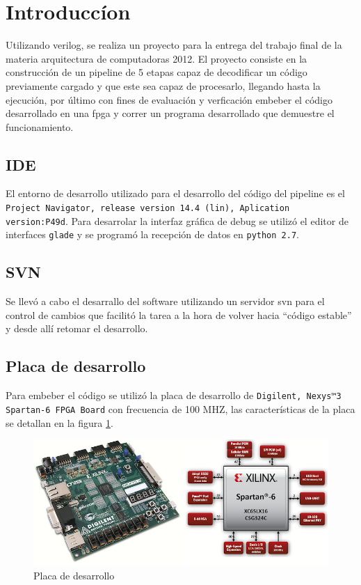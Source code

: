 \newpage
\section{Introducc\'ion}

Utilizando verilog, se realiza un proyecto para la entrega del trabajo final de la materia arquitectura de computadoras 2012. El proyecto consiste en la construcción de un pipeline de 5 etapas capaz de decodificar un código previamente cargado y que este sea capaz de procesarlo, llegando hasta la ejecución, por último con fines de evaluación y verficaci\'on embeber el c\'odigo desarrollado en una fpga y correr un programa desarrollado que demuestre el funcionamiento.

\subsection{IDE}
El entorno de desarrollo utilizado para el desarrollo del c\'odigo del pipeline es el \texttt{Project Navigator, release version 14.4 (lin), Aplication version:P49d}.
Para desarrolar la interfaz gr\'afica de debug se utiliz\'o el editor de interfaces \texttt{glade} y se program\'o la recepci\'on de datos en \texttt{python 2.7}. 

\subsection{SVN}
Se llev\'o a cabo el desarrallo del software utilizando un servidor svn para el control de cambios que facilit\'o la tarea a la hora de volver hacia ``c\'odigo estable'' y desde all\'i retomar el desarrollo.

\subsection{Placa de desarrollo}
Para embeber el c\'odigo se utiliz\'o la placa de desarrollo de \texttt{Digilent, Nexys™3 Spartan-6 FPGA Board} con frecuencia de 100 MHZ, las caracter\'isticas de la placa se detallan en la figura \ref{fig:digilent}.
\begin{figure}[H]
\centering
\includegraphics[scale=0.5]{img/digilent}
\caption{Placa de desarrollo}
\label{fig:digilent}
\end{figure} 		 
\newpage		

